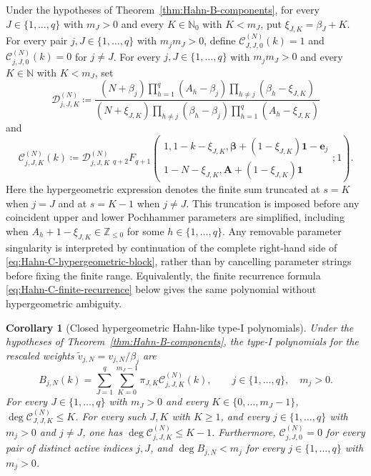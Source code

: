 \documentclass[10pt]{amsart}
\newcommand{\Nzero}{\mathbb N_0}
\newcommand{\one}{\boldsymbol 1}
\newcommand{\A}{\boldsymbol A}
\newcommand{\bbeta}{\boldsymbol\beta}
\newcommand{\ee}{\boldsymbol e}
\newcommand{\pFq}[5]{{}_{#1}F_{#2}\!\left(\begin{matrix}#3\\#4\end{matrix};#5\right)}
\theoremstyle{plain}
\newtheorem{corollary}[theorem]{Corollary}
\theoremstyle{definition}
\theoremstyle{remark}
\begin{document}
Under the hypotheses of Theorem~\ref{thm:Hahn-B-components}, for every
\(J\in\{1,\ldots,q\}\) with \(m_J>0\) and every
\(K\in\Nzero\) with \(K<m_J\), put
\(\xi_{J,K}=\beta_J+K\). For every
pair \(j,J\in\{1,\ldots,q\}\) with \(m_jm_J>0\), define
\(\mathcal C_{J,J,0}^{(N)}(k)=1\) and
\(\mathcal C_{j,J,0}^{(N)}(k)=0\) for \(j\ne J\).
For every \(j,J\in\{1,\ldots,q\}\) with \(m_jm_J>0\) and every
\(K\in\mathbb N\) with \(K<m_J\), set
\begin{equation}
 \mathcal D_{j,J,K}^{(N)}\coloneq
 \frac{(N+\beta_j)\prod_{h=1}^q(A_h-\beta_j)
       \prod_{h\ne j}(\beta_h-\xi_{J,K})}
 {(N+\xi_{J,K})\prod_{h\ne j}(\beta_h-\beta_j)
       \prod_{h=1}^q(A_h-\xi_{J,K})}
 \label{eq:Hahn-C-block-prefactor}
\end{equation}
and
\begin{equation}
 \mathcal C_{j,J,K}^{(N)}(k)\coloneq
 \mathcal D_{j,J,K}^{(N)}\;
 \pFq{q+2}{q+1}
 {1,1-k-\xi_{J,K},
  \bbeta+(1-\xi_{J,K})\one-\ee_j}
 {1-N-\xi_{J,K},
 \A+(1-\xi_{J,K})\one}{1}.
 \label{eq:Hahn-C-hypergeometric-block}
\end{equation}
Here the hypergeometric expression denotes the finite sum truncated at
\(s=K\) when \(j=J\) and at \(s=K-1\) when \(j\ne J\). This truncation is
imposed before any coincident upper and lower Pochhammer parameters are
simplified, including when
\(A_h+1-\xi_{J,K}\in\mathbb Z_{\le0}\) for some
\(h\in\{1,\ldots,q\}\). Any removable parameter
singularity is interpreted by continuation of the complete right-hand side
of \eqref{eq:Hahn-C-hypergeometric-block}, rather than by cancelling
parameter strings before fixing the finite range. Equivalently, the finite
recurrence formula \eqref{eq:Hahn-C-finite-recurrence} below gives the same
polynomial without hypergeometric ambiguity.

\begin{corollary}[Closed hypergeometric Hahn-like type-I polynomials]
\label{cor:Hahn-B-closed-components}
Under the hypotheses of Theorem~\ref{thm:Hahn-B-components}, the type-I
polynomials for the rescaled weights
\(\widetilde v_{j,N}=v_{j,N}/\beta_j\) are
\begin{equation}
 B_{j,N}(k)=
 \sum_{J=1}^q\sum_{K=0}^{m_J-1}
 \pi_{J,K}\mathcal C_{j,J,K}^{(N)}(k),
 \qquad j\in\{1,\ldots,q\},\quad m_j>0.
 \label{eq:Hahn-B-closed-components}
\end{equation}
For every \(J\in\{1,\ldots,q\}\) with \(m_J>0\) and every
\(K\in\{0,\ldots,m_J-1\}\),
\(\deg \mathcal C_{J,J,K}^{(N)}\le K\). For every such \(J,K\) with
\(K\ge1\), and every \(j\in\{1,\ldots,q\}\) with \(m_j>0\) and
\(j\ne J\), one has \(\deg \mathcal C_{j,J,K}^{(N)}\le K-1\).
Furthermore, \(\mathcal C_{j,J,0}^{(N)}=0\) for every pair of distinct
active indices \(j,J\), and \(\deg B_{j,N}<m_j\) for every
\(j\in\{1,\ldots,q\}\) with \(m_j>0\).
\end{corollary}
\end{document}
